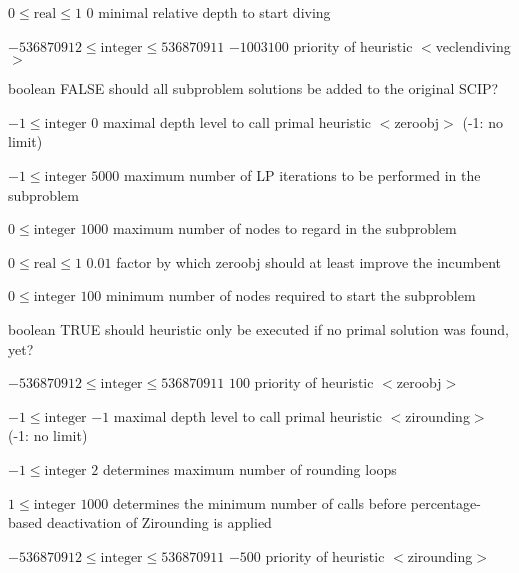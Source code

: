 %
{$0\leq\textrm{real}\leq1$}%
{$0$}%
{minimal relative depth to start diving}%
{}

%
{$-536870912\leq\textrm{integer}\leq536870911$}%
{$-1003100$}%
{priority of heuristic $<$veclendiving$>$}%
{}

%
{boolean}%
{FALSE}%
{should all subproblem solutions be added to the original SCIP?}%
{}

%
{$-1\leq\textrm{integer}$}%
{$0$}%
{maximal depth level to call primal heuristic $<$zeroobj$>$ (-1: no limit)}%
{}

%
{$-1\leq\textrm{integer}$}%
{$5000$}%
{maximum number of LP iterations to be performed in the subproblem}%
{}

%
{$0\leq\textrm{integer}$}%
{$1000$}%
{maximum number of nodes to regard in the subproblem}%
{}

%
{$0\leq\textrm{real}\leq1$}%
{$0.01$}%
{factor by which zeroobj should at least improve the incumbent}%
{}

%
{$0\leq\textrm{integer}$}%
{$100$}%
{minimum number of nodes required to start the subproblem}%
{}

%
{boolean}%
{TRUE}%
{should heuristic only be executed if no primal solution was found, yet?}%
{}

%
{$-536870912\leq\textrm{integer}\leq536870911$}%
{$100$}%
{priority of heuristic $<$zeroobj$>$}%
{}

%
{$-1\leq\textrm{integer}$}%
{$-1$}%
{maximal depth level to call primal heuristic $<$zirounding$>$ (-1: no limit)}%
{}

%
{$-1\leq\textrm{integer}$}%
{$2$}%
{determines maximum number of rounding loops}%
{}

%
{$1\leq\textrm{integer}$}%
{$1000$}%
{determines the minimum number of calls before percentage-based deactivation of Zirounding is applied}%
{}

%
{$-536870912\leq\textrm{integer}\leq536870911$}%
{$-500$}%
{priority of heuristic $<$zirounding$>$}%
{}

